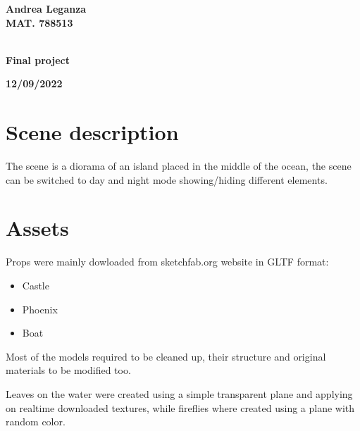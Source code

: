\documentclass[10pt,a4paper]{article}
\begin{document}
\begin{titlepage}
\vspace{15mm}
\begin{center}
{\LARGE{\bf Andrea Leganza}}\\
\vspace{3mm}
{\LARGE{\bf MAT. 788513}}\\
\vspace{3mm}
{\LARGE{\bf\ }}\\
\end{center}
\vspace{40mm}
\par
\noindent
\begin{minipage}[t]{0.47\textwidth}
{\large{\bf}}
\end{minipage}
\hfill
\begin{center}
{\large{\bf Final project }}
\end{center}
\vspace{20mm}
\begin{center}
{\large{\bf 12/09/2022}}
\end{center}
\end{titlepage}
\pagebreak


\section{Scene description}
The scene is a diorama of an island placed in the middle of the ocean, the scene can be switched to day and night mode showing/hiding different elements.

\section{Assets}

Props were mainly dowloaded from sketchfab.org website in GLTF format:

\begin{itemize}
 \item Castle
 \item Phoenix
 \item Boat
\end{itemize}

Most of the models required to be cleaned up, their structure and original materials to be modified too.

Leaves on the water were created using a simple transparent plane and applying on realtime downloaded textures, while fireflies where created using a plane with random color.
\end{document}
